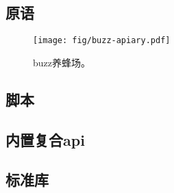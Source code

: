 \subsection{原语\statusred}\label{sec:primitives}


\begin{figure}[htbp]
   \centering
   \texttt{[image: fig/buzz-apiary.pdf]}
   \caption[buzz养蜂场\statusgreen]{buzz养蜂场。 }
   \label{fig:buzz-apiary}
\end{figure}

\subsection{脚本\statusred}
\label{sec:buzz}

\subsection{内置复合api \statusred}
\label{sec:lego}

\subsection{标准库\statusred}
\label{sec:stdlib}